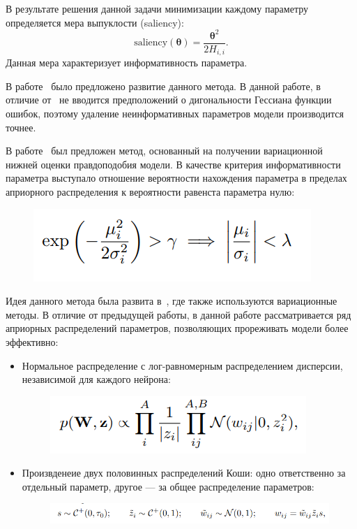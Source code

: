 В результате решения данной задачи минимизации каждому параметру определяется мера выпуклости (saliency):
\[
    \text{saliency}(\boldsymbol{\theta}) = \frac{\boldsymbol{\theta}^2}{2H_{i,i}}.
\]
Данная мера характеризует информативность параметра.

В работе~\cite{obs} было предложено развитие данного метода. В данной работе, в отличие от~\cite{obd} не вводится предположений о дигональности Гессиана функции ошибок, поэтому удаление неинформативных параметров модели производится точнее.

В работе~\cite{nips} был предложен метод, основанный на получении вариационной нижней оценки правдоподобия модели. В качестве критерия информативности параметра выступало отношение вероятности нахождения параметра в пределах априорного распределения к вероятности равенста параметра нулю:
\begin{figure}[H]
\includegraphics[width=\textwidth]{./plots/arch_review_figs/nips_var.png}
\end{figure}
Идея данного метода была развита в~\cite{bayes_compr}, где также используются вариационные методы. В отличие от предыдущей работы, в данной работе рассматривается ряд априорных распределений параметров, позволяющих прореживать модели более эффективно:
\begin{itemize}
\item Нормальное распределение с лог-равномерным распределением дисперсии, независимой для каждого нейрона:
\begin{figure}[H]
\includegraphics[width=\textwidth]{./plots/arch_review_figs/bayes_compr_group.png}
\end{figure}
\item Произвденеие двух половинных распределений Коши: одно ответственно за отдельный параметр, другое --- за общее распределение параметров:
\begin{figure}[H]
\includegraphics[width=\textwidth]{./plots/arch_review_figs/bayes_compr_cauchy.png}
\end{figure}
\end{itemize}

